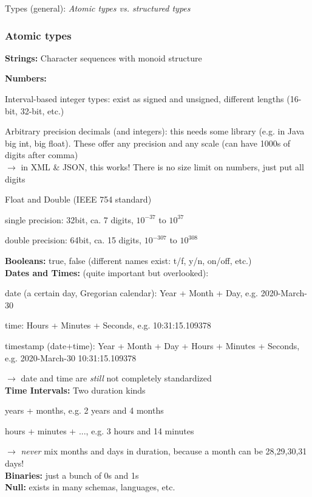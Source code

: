 \documentclass[11pt,oneside,a4paper]{article}
\begin{document}
Types (general): \textit{Atomic types vs. structured types}

\subsubsection{Atomic types}

\textbf{Strings:} Character sequences with monoid structure

\textbf{Numbers:}
\begin{compactitem}
	\item Interval-based integer types: exist as signed and unsigned, different lengths (16-bit, 32-bit, etc.)
	\item Arbitrary precision decimals (and integers): this needs some library (e.g. in Java big int, big float). These offer any precision and any scale (can have 1000s of digits after comma)\\
	$\rightarrow$ in XML \& JSON, this works! There is no size limit on numbers, just put all digits
	\item Float and Double	(IEEE 754 standard)
	\begin{compactitem}
		\item single precision: 32bit, ca. 7 digits, $10^{-37}$ to $10^{37}$
		\item double precision: 64bit, ca. 15 digits, $10^{-307}$ to $10^{308}$
	\end{compactitem}	
\end{compactitem}

\textbf{Booleans:} true, false (different names exist: t/f, y/n, on/off, etc.)\\
\textbf{Dates and Times:} (quite important but overlooked):
\begin{compactitem}
	\item date (a certain day, Gregorian calendar): Year + Month + Day, e.g. 2020-March-30
	\item time: Hours + Minutes + Seconds, e.g. 10:31:15.109378
	\item timestamp (date+time): Year + Month + Day + Hours + Minutes + Seconds,\\
	e.g. 2020-March-30 10:31:15.109378
\end{compactitem}
$\rightarrow$ date and time are \textit{still} not completely standardized\\

\textbf{Time Intervals:} Two duration kinds
\begin{compactitem}
	\item years + months, e.g. 2 years and 4 months
	\item hours + minutes + ..., e.g. 3 hours and 14 minutes
\end{compactitem}
$\rightarrow$ \textit{never} mix months and days in duration, because a month can be 28,29,30,31 days!\\
\textbf{Binaries:} just a bunch of 0s and 1s\\
\textbf{Null:} exists in many schemas, languages, etc.\\
\end{document}
